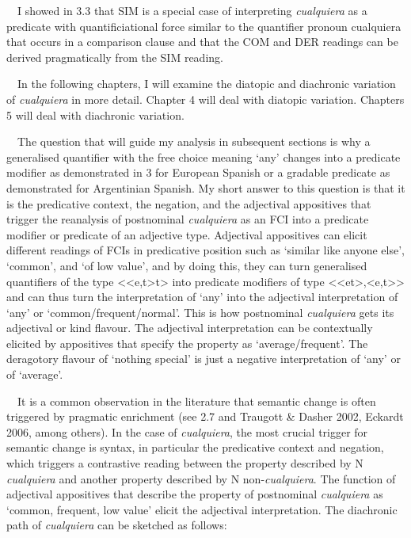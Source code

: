 \begin{styleStandard}
\ \ I showed in 3.3 that SIM is a special case of interpreting \textit{cualquiera} as a predicate with quantificiational force similar to the quantifier pronoun cualquiera that occurs in a comparison clause and that the COM and DER readings can be derived pragmatically from the SIM reading. 
\end{styleStandard}

\begin{styleStandard}
\ \ In the following chapters, I will examine the diatopic and diachronic variation of \textit{cualquiera} in more detail. Chapter 4 will deal with diatopic variation. Chapters 5 will deal with diachronic variation. 
\end{styleStandard}

\begin{styleStandard}
\ \ The question that will guide my analysis in subsequent sections is why a generalised quantifier with the free choice meaning ‘any’ changes into a predicate modifier as demonstrated in 3 for European Spanish or a gradable predicate as demonstrated for Argentinian Spanish. My short answer to this question is that it is the predicative context, the negation, and the adjectival appositives that trigger the reanalysis of postnominal \textit{cualquiera} as an FCI into a predicate modifier or predicate of an adjective type. Adjectival appositives can elicit different readings of FCIs in predicative position such as ‘similar like anyone else’, ‘common’, and ‘of low value’, and by doing this, they can turn generalised quantifiers of the type {\textless}{\textless}e,t{\textgreater}t{\textgreater} into predicate modifiers of type {\textless}{\textless}et{\textgreater},{\textless}e,t{\textgreater}{\textgreater} and can thus turn the interpretation of ‘any’ into the adjectival interpretation of ‘any’ or ‘common/frequent/normal’. This is how postnominal \textit{cualquiera} gets its adjectival or kind flavour. The adjectival interpretation can be contextually elicited by appositives that specify the property as ‘average/frequent’. The deragotory flavour of ‘nothing special’ is just a negative interpretation of ‘any’ or of ‘average’.
\end{styleStandard}

\begin{styleStandard}
\ \ It is a common observation in the literature that semantic change is often triggered by pragmatic enrichment (see 2.7 and Traugott \& Dasher 2002, Eckardt 2006, among others). In the case of \textit{cualquiera}, the most crucial trigger for semantic change is syntax, in particular the predicative context and negation, which triggers a contrastive reading between the property described by N\textit{ cualquiera} and another property described by N non-\textit{cualquiera}. The function of adjectival appositives that describe the property of postnominal \textit{cualquiera }as ‘common, frequent, low value’\textit{ }elicit the adjectival interpretation. The diachronic path of \textit{cualquiera} can be sketched as follows:
\end{styleStandard}

